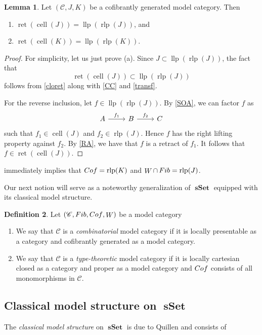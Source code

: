 \documentclass[10pt,letterpaper,cm]{nupset}
\theoremstyle{definition}
\newtheorem{definition}{Definition}[subsection]
\theoremstyle{theorem}
\newtheorem{lemma}[definition]{Lemma}
\theoremstyle{remark}
\newcommand{\0}{\mathbf{0}}
\newcommand{\1}{\mathbf{1}}
\newcommand{\2}{\mathbf{2}}
\DeclareMathOperator{\sset}{\mathbf{sSet}}
\renewcommand{\c}{\mathscr{C}}
\DeclareMathOperator{\fib}{\mathnormal{Fib}}
\DeclareMathOperator{\cof}{\mathnormal{Cof}}
\DeclareMathOperator{\we}{\mathnormal{W}}
\DeclareMathOperator{\cell}{cell}
\DeclareMathOperator{\ret}{ret}
\DeclareMathOperator{\rlp}{rlp}
\DeclareMathOperator{\llp}{llp}
\newcommand{\be}{\begin{enumerate}}
\newcommand{\ee}{\end{enumerate}}
\begin{document}
\begin{lemma}\label{cfsimp}
Let $\left(\c, J, K\right)$ be a cofibrantly generated model category. Then 
\be[label=(\alph*)]
\item $\ret(\cell(J)) = \llp(\rlp(J))$, and
\item $\ret(\cell(K))= \llp(\rlp(K))$.
\ee
\end{lemma}
\begin{proof}
For simplicity, let us just prove (a). Since $J \subset \llp(\rlp(J))$, the fact that $$\ret(\cell(J)) \subset \llp(\rlp(J))$$ follows from  \cref{cloret} along with \cref{CC} and \cref{transf}.

\smallskip

For the reverse inclusion, let $f\in \llp(\rlp(J))$. By \cref{SOA}, we can factor $f$ as
\[
\begin{tikzcd}
A \arrow[r, "f_1"] & B \arrow[r, "f_2"] & C
\end{tikzcd}
\] such that $f_1 \in \cell(J)$ and $f_2 \in \rlp(J)$. Hence $f$ has the right lifting property against $f_2$. By \cref{RA}, we have that $f$ is a retract of $f_1$. It follows that $f\in \ret(\cell(J))$.
\end{proof}

 immediately implies that $\cof = \rlp(K)$ and $\we \cap \fib = \rlp(J)$.

\medskip

Our next notion will serve as a noteworthy generalization of $\sset$ equipped with its classical model structure.

\begin{definition}
Let  $\left(\c, \fib, \cof, \we\right)$ be a model category 
\be
\item We say that $\c$ is a \textit{combinatorial} model category if it is locally presentable as a category and cofibrantly generated as a model category.
\item We say that $\c$ is a \textit{type-theoretic} model category if it is  locally cartesian closed as a category and proper as a model category and $\cof$ consists of all monomorphisms in $\c$. 
\ee
\end{definition}


\subsection{Classical model structure on $\sset$}\label{cmodsset}

The \textit{classical model structure} on $\sset$ is due to Quillen and consists of
\end{document}
